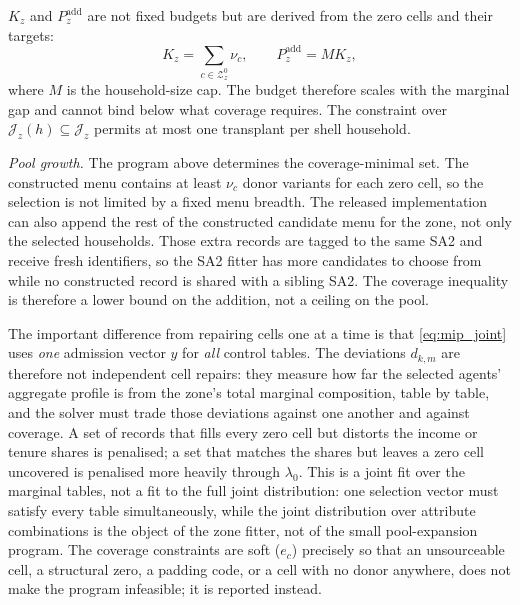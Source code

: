 $K_z$ and $P_z^{\mathrm{add}}$ are not fixed budgets but are derived from the
zero cells and their targets:
\begin{equation}
K_z=\sum_{c\in\mathcal{Z}_z^0}\nu_c,
\qquad
P_z^{\mathrm{add}}=M K_z,
\label{eq:mip_budget}
\end{equation}
where $M$ is the household-size cap. The budget therefore scales with the
marginal gap and cannot bind below what coverage requires. The constraint over
$\mathcal{J}_z(h)\subseteq\mathcal{J}_z$ permits at most one transplant per
shell household.

\emph{Pool growth.} The program above determines the coverage-minimal set. The
constructed menu contains at least $\nu_c$ donor variants for each zero cell, so
the selection is not limited by a fixed menu breadth. The released
implementation can also append the rest of the constructed candidate
menu for the zone, not only the selected households. Those extra records are
tagged to the same SA2 and receive fresh identifiers, so the SA2 fitter has more
candidates to choose from while no constructed record is shared with a sibling
SA2. The coverage inequality is therefore a lower bound on the addition, not a
ceiling on the pool.

The important difference from repairing cells one at a time is that
\eqref{eq:mip_joint} uses \emph{one} admission vector $y$ for \emph{all} control
tables. The deviations $d_{k,m}$ are therefore not independent cell repairs:
they measure how far the selected agents' aggregate profile is from the zone's
total marginal composition, table by table, and the solver must trade those
deviations against one another and against coverage. A set of records that fills
every zero cell but distorts the income or tenure shares is penalised; a set that
matches the shares but leaves a zero cell uncovered is penalised more heavily
through $\lambda_0$. This is a joint fit over the marginal tables, not a fit to
the full joint distribution: one selection vector must satisfy every table
simultaneously, while the joint distribution over attribute combinations is the
object of the zone fitter, not of the small pool-expansion program. The
coverage constraints are soft ($e_c$) precisely so that an unsourceable
cell, a structural zero, a padding code, or a cell with no donor anywhere, does
not make the program infeasible; it is reported instead.

